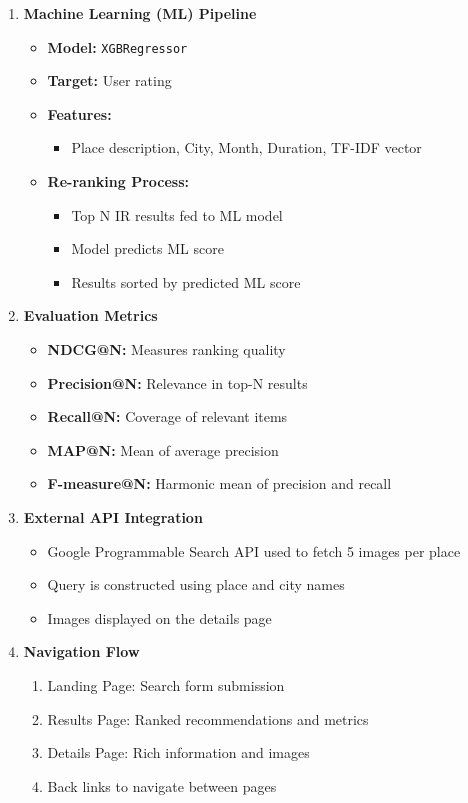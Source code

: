 \documentclass[12pt,a4paper]{article}
\begin{document}
\begin{enumerate}
    \item \textbf{Machine Learning (ML) Pipeline}
    \begin{itemize}
        \item \textbf{Model:} \texttt{XGBRegressor}
        \item \textbf{Target:} User rating
        \item \textbf{Features:}
        \begin{itemize}
            \item Place description, City, Month, Duration, TF-IDF vector
        \end{itemize}
        \item \textbf{Re-ranking Process:}
        \begin{itemize}
            \item Top N IR results fed to ML model
            \item Model predicts ML score
            \item Results sorted by predicted ML score
        \end{itemize}
    \end{itemize}

    \item \textbf{Evaluation Metrics}
    \begin{itemize}
        \item \textbf{NDCG@N:} Measures ranking quality
        \item \textbf{Precision@N:} Relevance in top-N results
        \item \textbf{Recall@N:} Coverage of relevant items
        \item \textbf{MAP@N:} Mean of average precision
        \item \textbf{F-measure@N:} Harmonic mean of precision and recall
    \end{itemize}

    \item \textbf{External API Integration}
    \begin{itemize}
        \item Google Programmable Search API used to fetch 5 images per place
        \item Query is constructed using place and city names
        \item Images displayed on the details page
    \end{itemize}

    \item \textbf{Navigation Flow}
    \begin{enumerate}
        \item Landing Page: Search form submission
        \item Results Page: Ranked recommendations and metrics
        \item Details Page: Rich information and images
        \item Back links to navigate between pages
    \end{enumerate}
\end{enumerate}
\end{document}
